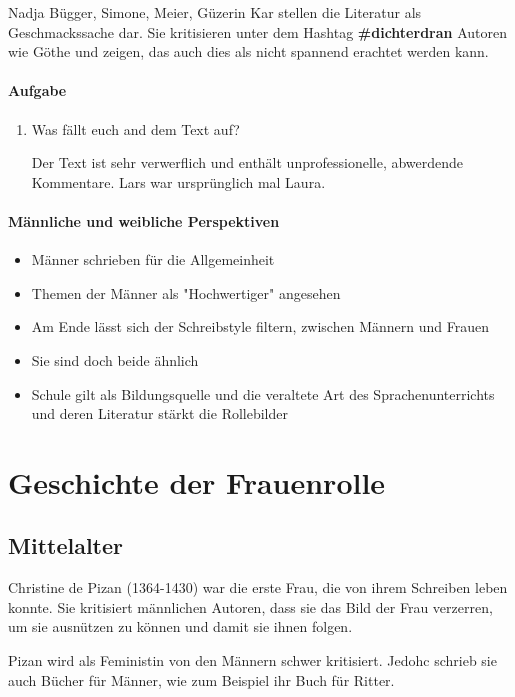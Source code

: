 \documentclass{article}
\begin{document}
Nadja Bügger, Simone, Meier, Güzerin Kar stellen die Literatur als Geschmackssache dar. Sie kritisieren unter dem Hashtag \textbf{\#dichterdran} Autoren wie Göthe und zeigen, das auch dies als nicht spannend erachtet werden kann.

\paragraph{Aufgabe}
\begin{enumerate}
    \item Was fällt euch and dem Text auf?

    Der Text ist sehr verwerflich und enthält unprofessionelle, abwerdende Kommentare. Lars war ursprünglich mal Laura.
\end{enumerate}

\paragraph{Männliche und weibliche Perspektiven}
\begin{itemize}
    \item Männer schrieben für die Allgemeinheit
    \item Themen der Männer als "Hochwertiger" angesehen
    \item Am Ende lässt sich der Schreibstyle filtern, zwischen Männern und Frauen
    \item Sie sind doch beide ähnlich
    \item Schule gilt als Bildungsquelle und die veraltete Art des Sprachenunterrichts und deren Literatur stärkt die Rollebilder
\end{itemize}



\section{Geschichte der Frauenrolle}
\subsection{Mittelalter}
Christine de Pizan (1364-1430) war die erste Frau, die von ihrem Schreiben leben konnte. Sie kritisiert männlichen Autoren, dass sie das Bild der Frau verzerren, um sie ausnützen zu können und damit sie ihnen folgen.

Pizan wird als Feministin von den Männern schwer kritisiert. Jedohc schrieb sie auch Bücher für Männer, wie zum Beispiel ihr Buch für Ritter.
\end{document}
